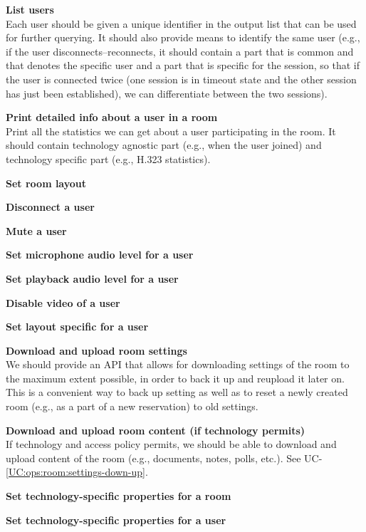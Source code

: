 \documentclass[a4paper]{report}
\makeatletter
\newcounter{UCcounter}
\newenvironment{UseCases}%
	{\begin{list}{UC-\arabic{UCcounter}}{\@nmbrlisttrue\def\@listctr{UCcounter}}}%
	{\end{list}}
\newcommand{\UClabel}[1]{\label{UC:#1}}
\newcommand{\UCref}[1]{UC-\ref{UC:#1}}
\newcommand{\UseCase}[2]{\item\UClabel{#2} \textbf{#1}\\}
\makeatother
\begin{document}
\begin{UseCases}

\UseCase{List users}{ops:room:users-list}

Each user should be given a unique identifier in the output list that can be
used for further querying. It should also provide means to identify the same
user (e.g., if the user disconnects--reconnects, it should contain a part that
is common and that denotes the specific user and a part that is specific for
the session, so that if the user is connected twice (one session is in timeout
state and the other session has just been established), we can differentiate
between the two sessions).

\UseCase{Print detailed info about a user in a room}{ops:room:user-info}

Print all the statistics we can get about a user participating in the room. It
should contain technology agnostic part (e.g., when the user joined) and
technology specific part (e.g., H.323 statistics).

\UseCase{Set room layout}{ops:room:layout}

\UseCase{Disconnect a user}{ops:room:user-disconnect}

\UseCase{Mute a user}{ops:room:user-mute}

\UseCase{Set microphone audio level for a user}{ops:room:user-miclevel}

\UseCase{Set playback audio level for a user}{ops:room:user-playlevel}

\UseCase{Disable video of a user}{ops:room:user-video-off}

\UseCase{Set layout specific for a user}{ops:room:user-layout}

\UseCase{Download and upload room settings}{ops:room:settings-down-up}

We should provide an API that allows for downloading settings of the room to
the maximum extent possible, in order to back it up and reupload it later on.
This is a convenient way to back up setting as well as to reset a newly created
room (e.g., as a part of a new reservation) to old settings.

\UseCase{Download and upload room content (if technology
permits)}{ops:room:content-down-up}

If technology and access policy permits, we should be able to download and
upload content of the room (e.g., documents, notes, polls, etc.). See
\UCref{ops:room:settings-down-up}.

\UseCase{Set technology-specific properties for a room}{ops:room:room-techspec}

\UseCase{Set technology-specific properties for a user}{ops:room:user-techspec}

\end{UseCases}
\end{document}
